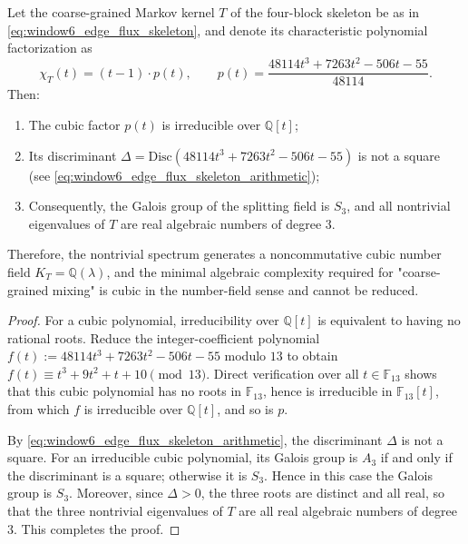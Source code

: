\begin{theorem}\label{thm:xi-window6-four-block-kernel-cubic-field-s3}
Let the coarse-grained Markov kernel \(T\) of the four-block skeleton be as in \eqref{eq:window6_edge_flux_skeleton},
and denote its characteristic polynomial factorization as
\[
\chi_T(t)=(t-1)\cdot p(t),
\qquad
p(t)=\frac{48114t^3+7263t^2-506t-55}{48114}.
\]
Then:
\begin{enumerate}
  \item The cubic factor \(p(t)\) is irreducible over \(\mathbb Q[t]\);
  \item Its discriminant \(\Delta=\mathrm{Disc}(48114t^3+7263t^2-506t-55)\) is not a square (see \eqref{eq:window6_edge_flux_skeleton_arithmetic});
  \item Consequently, the Galois group of the splitting field is \(S_3\), and all nontrivial eigenvalues of \(T\) are real algebraic numbers of degree \(3\).
\end{enumerate}
Therefore, the nontrivial spectrum generates a noncommutative cubic number field \(K_T=\mathbb Q(\lambda)\), and the minimal algebraic complexity required for "coarse-grained mixing" is cubic in the number-field sense and cannot be reduced.
\end{theorem}

\begin{proof}
For a cubic polynomial, irreducibility over \(\mathbb Q[t]\) is equivalent to having no rational roots.
Reduce the integer-coefficient polynomial
\(
f(t):=48114t^3+7263t^2-506t-55
\)
modulo \(13\) to obtain
\(
f(t)\equiv t^3+9t^2+t+10\pmod{13}
\).
Direct verification over all \(t\in\mathbb F_{13}\) shows that this cubic polynomial has no roots in \(\mathbb F_{13}\), hence is irreducible in \(\mathbb F_{13}[t]\), from which \(f\) is irreducible over \(\mathbb Q[t]\), and so is \(p\).
\par
By \eqref{eq:window6_edge_flux_skeleton_arithmetic}, the discriminant \(\Delta\) is not a square.
For an irreducible cubic polynomial, its Galois group is \(A_3\) if and only if the discriminant is a square; otherwise it is \(S_3\).
Hence in this case the Galois group is \(S_3\).
Moreover, since \(\Delta>0\), the three roots are distinct and all real, so that the three nontrivial eigenvalues of \(T\) are all real algebraic numbers of degree \(3\). This completes the proof.
\end{proof}

